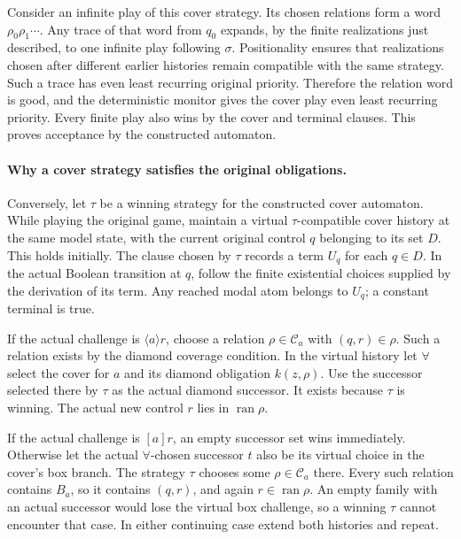 Consider an infinite play of
this cover strategy. Its chosen
relations form a word
\(\rho_0\rho_1\cdots\).
Any trace of that word from
\(q_0\) expands, by the finite
realizations just described,
to one infinite play following
\(\sigma\). Positionality ensures
that realizations chosen after
different earlier histories
remain compatible with the
same strategy.
Such a trace has even least
recurring original priority.
Therefore the relation word
is good, and the deterministic
monitor gives the cover play
even least recurring priority.
Every finite play also wins
by the cover and terminal
clauses. This proves acceptance
by the constructed automaton.

\paragraph{Why a cover strategy satisfies the original obligations.}
Conversely, let \(\tau\) be a
winning strategy for the
constructed cover automaton.
While playing the original
game, maintain a virtual
\(\tau\)-compatible cover history
at the same model state, with
the current original control
\(q\) belonging to its set \(D\).
This holds initially.
The clause chosen by \(\tau\)
records a term \(U_q\) for
each \(q\in D\).
In the actual Boolean transition
at \(q\), follow the finite
existential choices supplied
by the derivation of its term.
Any reached modal atom belongs
to \(U_q\); a constant terminal
is true.

If the actual challenge is
\(\langle a\rangle r\), choose
a relation \(\rho\in\mathcal C_a\)
with \((q,r)\in\rho\).
Such a relation exists by the
diamond coverage condition.
In the virtual history let
\(\forall\) select the cover
for \(a\) and its diamond
obligation \(k(z,\rho)\).
Use the successor selected
there by \(\tau\) as the
actual diamond successor.
It exists because \(\tau\)
is winning. The actual new
control \(r\) lies in
\(\operatorname{ran}\rho\).

If the actual challenge is
\([a]r\), an empty successor
set wins immediately.
Otherwise let the actual
\(\forall\)-chosen successor
\(t\) also be its virtual
choice in the cover's box
branch. The strategy \(\tau\)
chooses some \(\rho\in\mathcal C_a\)
there. Every such relation
contains \(B_a\), so it
contains \((q,r)\), and again
\(r\in\operatorname{ran}\rho\).
An empty family with an
actual successor would lose
the virtual box challenge,
so a winning \(\tau\) cannot
encounter that case.
In either continuing case
extend both histories and repeat.

